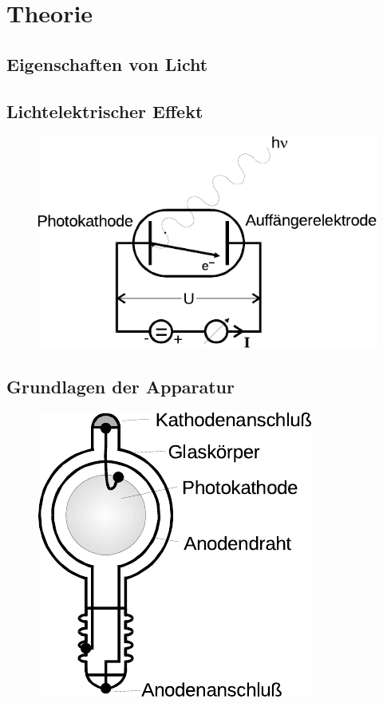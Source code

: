 \section[Theorie]{Theorie \textnormal{\cite{photo}}}
\label{sec:theorie}

\subsection{Eigenschaften von Licht}

\subsection{Lichtelektrischer Effekt}

\begin{figure}[H]
	\centering
	\hspace{4ex}
	\includegraphics[width=0.5\linewidth]{content/grafik/prinzip.pdf}
	\caption{}
	\label{fig:prinzip}
\end{figure}

\subsection{Grundlagen der Apparatur}

\begin{figure}[H]
	\centering
	\hspace{12.5ex}
	\includegraphics[width=0.3\linewidth]{content/grafik/photozelle.pdf}
	\caption{}
	\label{fig:photozelle}
\end{figure}

